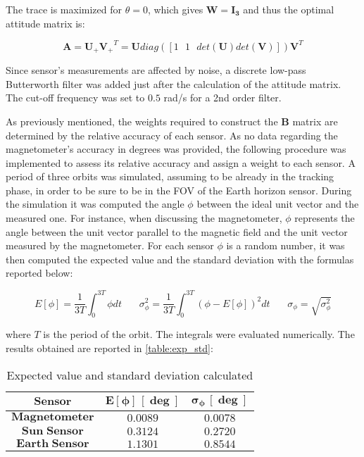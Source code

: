 The trace is maximized for $\theta=0$, which gives $\boldsymbol{W}=\boldsymbol{I_3}$ and thus the optimal attitude matrix is:

\begin{equation}
    \boldsymbol{A}=\boldsymbol{U_{+}V_{+}}^T=\boldsymbol{U}diag([1 \  \ \ 1 \ \ \ det(\boldsymbol{U})det(\boldsymbol{V})])\boldsymbol{V}^T
\end{equation}

Since sensor's measurements are affected by noise, a discrete low-pass Butterworth filter was added just after the calculation of the attitude matrix. The cut-off frequency was set to $0.5$ rad/s for a 2nd order filter.
 
As previously mentioned, the weights required to construct the $\boldsymbol{B}$ matrix are determined by the relative accuracy of each sensor. As no data regarding the magnetometer's accuracy in degrees was provided, the following procedure was implemented to assess its relative accuracy and assign a weight to each sensor.
A period of three orbits was simulated, assuming to be already in the tracking phase, in order to be sure to be in the FOV of the Earth horizon sensor. During the simulation it was computed the angle $\phi$ between the ideal unit vector and the measured one. For instance, when discussing the magnetometer, $\phi$ represents the angle between the unit vector parallel to the magnetic field and the unit vector measured by the magnetometer. For each sensor $\phi$ is a random number, it was then computed the expected value and the standard deviation with the formulas reported below:

\begin{equation}
    E[\phi]=\frac{1}{3T}\int_{0}^{3T}\phi dt \ \ \ \  \ \ \ \ \sigma_{\phi}^2=\frac{1}{3T}\int_{0}^{3T}(\phi - E[\phi])^2 dt \ \ \ \ \ \ \ \ \sigma_{\phi}=\sqrt{\sigma_{\phi}^2}
\end{equation}

where $T$ is the period of the orbit. The integrals were evaluated numerically. The results obtained are reported in \autoref{table:exp_std}:

\begin{table}[H]

    \centering
    \begin{tabular}{|c|c|c|}
    \hline
    $\bm{Sensor}$ & $\bm{E\left[\phi\right]\, [\deg]}$ & $\bm{\sigma_{\phi} \, [\deg]}$ \\
    \hline
    $\bm{Magnetometer}$ & $0.0089$ & $0.0078$  \\
    \hline
    $\bm{Sun\;Sensor}$ & $0.3124$ & $0.2720$  \\
    \hline
    $\bm{Earth\;Sensor}$ & $1.1301$ & $0.8544$  \\
    \hline
    \end{tabular}
    
    \caption{Expected value and standard deviation calculated}
    \label{table:exp_std}
    
\end{table}

